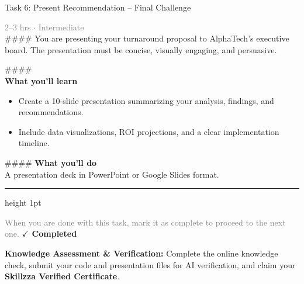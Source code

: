 \documentclass[10pt,a4paper]{article}
\begin{document}
\begin{taskbox}{Task 6: Present Recommendation – Final Challenge}

    {\small \textcolor{gray}{2--3 hrs $\cdot$ Intermediate}}\\[12pt]

    \#\#\#\#   
You are presenting your turnaround proposal to AlphaTech’s executive board. The presentation must be concise, visually engaging, and persuasive.  

\#\#\#\# \\[10pt]
\vspace{8pt}
{\large \textbf{\textcolor{brandLight}{What you'll learn}}}\\[4pt]  
\begin{itemize}
    \item Create a 10-slide presentation summarizing your analysis, findings, and recommendations.  
    \item Include data visualizations, ROI projections, and a clear implementation timeline.  
\end{itemize}

\#\#\#\# \vspace{8pt}
{\large \textbf{\textcolor{brandLight}{What you'll do}}}\\[4pt]  
A presentation deck in PowerPoint or Google Slides format.\par

    \vspace{16pt}

    \textcolor{cardBorder}{\hrule height 1pt}\vspace{8pt}

    \small \textcolor{gray}{When you are done with this task, mark it as complete to proceed to the next one.} \hfill \textbf{\textcolor{brandDark}{$\checkmark$ Completed}}

\end{taskbox}

\begin{completionbox}
    \textbf{Knowledge Assessment \& Verification:} Complete the online knowledge check, submit your code and presentation files for AI verification, and claim your \textbf{Skillzza Verified Certificate}.
\end{completionbox}

\newpage


\end{document}
